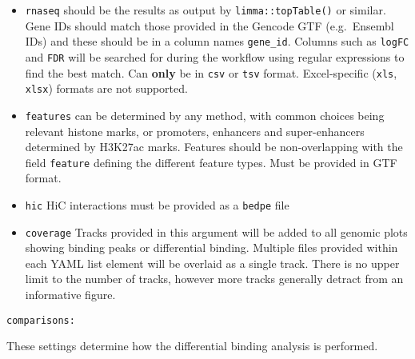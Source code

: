 \documentclass[
]{book}
\providecommand{\tightlist}{%
  \setlength{\itemsep}{0pt}\setlength{\parskip}{0pt}}
\begin{document}
\begin{itemize}
\tightlist
\item
  \texttt{rnaseq} should be the results as output by \texttt{limma::topTable()} or similar. Gene IDs should match those provided in the Gencode GTF (e.g.~Ensembl IDs) and these should be in a column names \texttt{gene\_id}. Columns such as \texttt{logFC} and \texttt{FDR} will be searched for during the workflow using regular expressions to find the best match. Can \textbf{only} be in \texttt{csv} or \texttt{tsv} format. Excel-specific (\texttt{xls}, \texttt{xlsx}) formats are not supported.
\item
  \texttt{features} can be determined by any method, with common choices being relevant histone marks, or promoters, enhancers and super-enhancers determined by H3K27ac marks. Features should be non-overlapping with the field \texttt{feature} defining the different feature types. Must be provided in GTF format.
\item
  \texttt{hic} HiC interactions must be provided as a \texttt{bedpe} file
\item
  \texttt{coverage} Tracks provided in this argument will be added to all genomic plots showing binding peaks or differential binding. Multiple files provided within each YAML list element will be overlaid as a single track. There is no upper limit to the number of tracks, however more tracks generally detract from an informative figure.
\end{itemize}

\texttt{comparisons:}

These settings determine how the differential binding analysis is performed.
\end{document}
